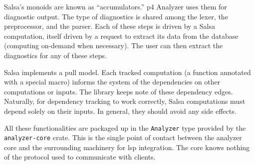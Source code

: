 Salsa's monoids are known as ``accumulators.'' \acrshort{p4} Analyzer uses them
for diagnostic output. The type of diagnostics is shared among the lexer, the
preprocessor, and the parser. Each of these steps is driven by a Salsa
computation, itself driven by a request to extract its data from the database
(computing on-demand when necessary). The user can then extract the diagnostics
for any of these steps.

Salsa implements a pull model. Each tracked computation (a function annotated
with a special macro) informs the system of the dependencies on other
computations or inputs. The library keeps note of these dependency edges.
Naturally, for dependency tracking to work correctly, Salsa computations must
depend solely on their inputs. In general, they should avoid any side effects.

All these functionalities are packaged up in the \texttt{Analyzer} type provided
by the \texttt{analyzer-core} crate. This is the single point of contact between
the analyzer core and the surrounding machinery for \acrshort{lsp} integration.
The core knows nothing of the protocol used to communicate with clients.
